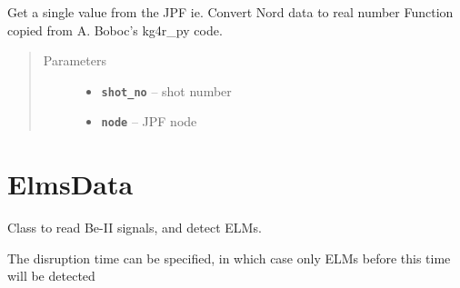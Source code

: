 \documentclass[letterpaper,10pt,english]{sphinxmanual}
\begin{document}
\begin{fulllineitems}
\begin{fulllineitems}
\end{fulllineitems}


\begin{fulllineitems}
\label{kg1_ppf_data:kg1_ppf_data.Kg1PPFData.get_jpf_point}
Get a single value from the JPF
ie. Convert Nord data to real number
Function copied from A. Boboc's kg4r\_py code.
\begin{quote}\begin{description}
\item[{Parameters}] \leavevmode\begin{itemize}
\item {} 
\textbf{\texttt{shot\_no}} -- shot number

\item {} 
\textbf{\texttt{node}} -- JPF node

\end{itemize}

\end{description}\end{quote}

\end{fulllineitems}


\end{fulllineitems}



\section{ElmsData}
\label{elms_data:elmsdata}\label{elms_data:module-elms_data}\label{elms_data::doc}
Class to read Be-II signals, and detect ELMs.

The disruption time can be specified, in which case only ELMs before this time will be detected
\end{document}
